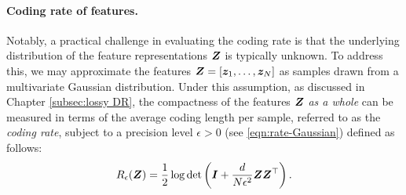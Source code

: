 \documentclass[../../book-main.tex]{subfiles}
\begin{document}
\paragraph{Coding rate of features.} Notably, a practical challenge in evaluating the coding rate is that the underlying distribution of the feature representations $\bm{Z}$ is typically unknown. To address this, we may approximate the features $\bm{Z} = [\bm{z}_1, \ldots, \bm{z}_N]$ as samples drawn from a multivariate Gaussian distribution. Under this assumption, as discussed in Chapter \ref{subsec:lossy DR}, the compactness of the features $\bm{Z}$ {\em as a whole} can be measured in terms of the average coding length per sample,  referred to as the {\em coding rate}, subject to a precision level $\epsilon > 0$ (see \eqref{eqn:rate-Gaussian}) defined as follows:
\begin{equation}
	R_{\epsilon}(\bm{Z}) = \frac{1}{2}\log\det\left(\bm{I} + \frac{d}{N\epsilon^{2}}\bm{Z}\bm{Z}^{\top}\right).
	\label{chap4-eqn:coding-length-eval}
\end{equation}
\end{document}

